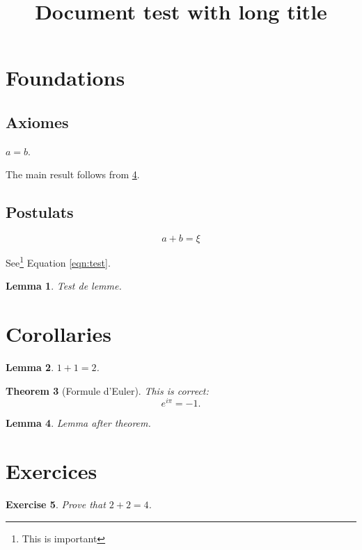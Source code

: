 \documentclass[a4paper]{article}
\title{Document test with long title}
\newtheorem{theorem}{Theorem}[section]
\newtheorem{lem}[theorem]{Lemma}
\newtheorem{exo}[theorem]{Exercise}
\begin{document}
\section{Foundations}
\subsection{Axiomes}

$a = b$.

The main result follows from \ref{lem3}.
\subsection{Postulats}
\begin{equation}
\label{eqn:test}
a+b = ξ
\end{equation}

See\footnote{This is important} Equation \ref{eqn:test}.

\begin{lem}
	\label{lem1}
	Test de lemme.
\end{lem}

\section{Corollaries}

\begin{lem}
	\label{lem2}
	$1 + 1 = 2$.
\end{lem}


\begin{theorem}[Formule d'Euler]
\label{thm1}
This is correct:
\[
	e^{i\pi} = -1.
\]
\end{theorem}

\begin{lem}
	\label{lem3}
	Lemma after theorem.
\end{lem}
\section{Exercices}

\begin{exo}
  Prove that $2 + 2 = 4$.
\end{exo}
\end{document}

